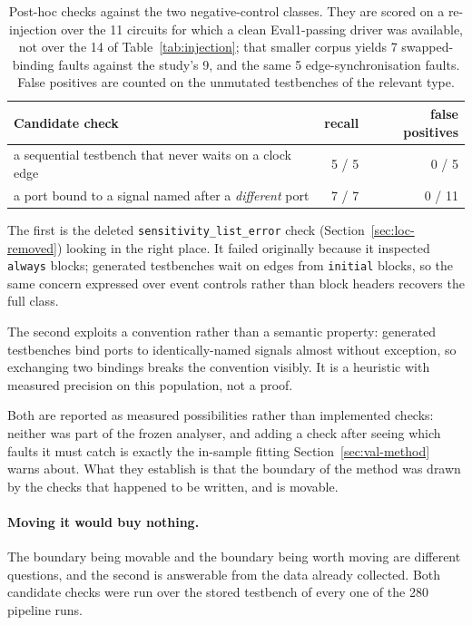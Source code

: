 \documentclass[11pt,a4paper,titlepage=false]{scrreprt}
\begin{document}
\begin{table}[H]
\centering
\small
\begin{tabular}{@{}p{7.2cm} r r@{}}
\toprule
\textbf{Candidate check} & \textbf{recall} & \textbf{false positives} \\
\midrule
a sequential testbench that never waits on a clock edge & 5 / 5 & 0 / 5 \\
a port bound to a signal named after a \emph{different} port & 7 / 7 & 0 / 11 \\
\bottomrule
\end{tabular}
\caption{Post-hoc checks against the two negative-control classes. They are scored on a
re-injection over the 11 circuits for which a clean Eval1-passing driver was available,
not over the 14 of Table~\ref{tab:injection}; that smaller corpus yields 7 swapped-binding
faults against the study's 9, and the same 5 edge-synchronisation faults. False positives
are counted on the unmutated testbenches of the relevant type.}
\label{tab:candidate-checks}
\end{table}

The first is the deleted \texttt{sensitivity\_list\_error} check
(Section~\ref{sec:loc-removed}) looking in the right place. It failed originally because it
inspected \texttt{always} blocks; generated testbenches wait on edges from \texttt{initial}
blocks, so the same concern expressed over event controls rather than block headers recovers
the full class.

The second exploits a convention rather than a semantic property: generated testbenches bind
ports to identically-named signals almost without exception, so exchanging two bindings
breaks the convention visibly. It is a heuristic with measured precision on this population,
not a proof.

Both are reported as measured possibilities rather than implemented checks: neither was part
of the frozen analyser, and adding a check after seeing which faults it must catch is exactly
the in-sample fitting Section~\ref{sec:val-method} warns about. What they establish is that
the boundary of the method was drawn by the checks that happened to be written, and is
movable.

\paragraph{Moving it would buy nothing.} The boundary being movable and the boundary being
worth moving are different questions, and the second is answerable from the data already
collected. Both candidate checks were run over the stored testbench of every one of the 280
pipeline runs.
\end{document}
